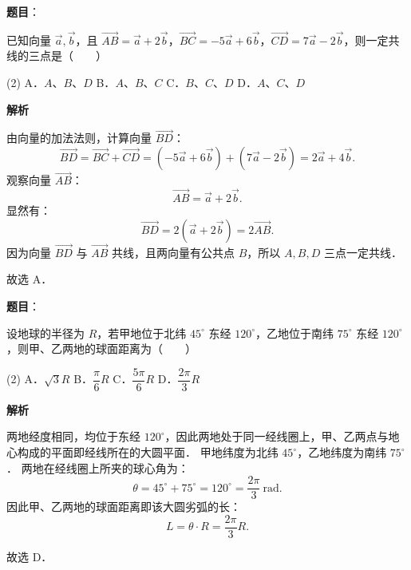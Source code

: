 \begin{answer}

\textbf{题目}：

已知向量 $\vec{a}, \vec{b}$，且 $\vec{AB} = \vec{a} + 2\vec{b}$，$\vec{BC} = -5\vec{a} + 6\vec{b}$，$\vec{CD} = 7\vec{a} - 2\vec{b}$，则一定共线的三点是\mbox{（　　）}

\begin{gkopts}(2)
\task A．$A$、$B$、$D$
\task B．$A$、$B$、$C$
\task C．$B$、$C$、$D$
\task D．$A$、$C$、$D$
\end{gkopts}

\textbf{解析}

由向量的加法法则，计算向量 $\vec{BD}$：
\nopagebreak[4]
\[
\vec{BD} = \vec{BC} + \vec{CD} = (-5\vec{a} + 6\vec{b}) + (7\vec{a} - 2\vec{b}) = 2\vec{a} + 4\vec{b}.
\]
观察向量 $\vec{AB}$：
\nopagebreak[4]
\[
\vec{AB} = \vec{a} + 2\vec{b}.
\]
显然有：
\nopagebreak[4]
\[
\vec{BD} = 2(\vec{a} + 2\vec{b}) = 2\vec{AB}.
\]
因为向量 $\vec{BD}$ 与 $\vec{AB}$ 共线，且两向量有公共点 $B$，所以 $A, B, D$ 三点一定共线．

故选 A．


\end{answer}
\begin{answer}

\textbf{题目}：

设地球的半径为 $R$，若甲地位于北纬 $45^\circ$ 东经 $120^\circ$，乙地位于南纬 $75^\circ$ 东经 $120^\circ$，则甲、乙两地的球面距离为\mbox{（　　）}

\begin{gkopts}(2)
\task A．$\sqrt{3}R$
\task B．$\dfrac{\pi}{6}R$
\task C．$\dfrac{5\pi}{6}R$
\task D．$\dfrac{2\pi}{3}R$
\end{gkopts}

\textbf{解析}

两地经度相同，均位于东经 $120^\circ$，因此两地处于同一经线圈上，甲、乙两点与地心构成的平面即经线所在的大圆平面．
甲地纬度为北纬 $45^\circ$，乙地纬度为南纬 $75^\circ$．
两地在经线圈上所夹的球心角为：
\nopagebreak[4]
\[
\theta = 45^\circ + 75^\circ = 120^\circ = \dfrac{2\pi}{3}\ \text{rad}.
\]
因此甲、乙两地的球面距离即该大圆劣弧的长：
\nopagebreak[4]
\[
L = \theta \cdot R = \dfrac{2\pi}{3}R.
\]

故选 D．


\end{answer}

